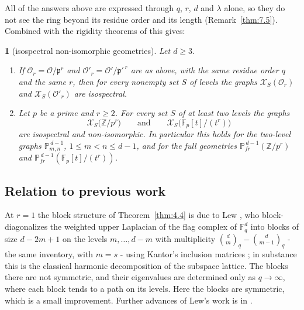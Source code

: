 \documentclass[11pt]{article}
\numberwithin{equation}{section}
\theoremstyle{plain}
\newcommand{\restatedname}{}
\newtheorem*{restated}{\restatedname}
\newenvironment{restate}[2]{\renewcommand{\restatedname}{#1~\ref{#2}}\begin{restated}}{\end{restated}}
\theoremstyle{definition}
\begin{document}
All of the answers above are expressed through $q$, $r$, $d$ and $\lambda$ alone, so
they do not see the ring beyond its residue order and its length (Remark~\ref{thm:7.5}).
Combined with the rigidity theorems of \cite{LP25} this gives:

\begin{restate}{Theorem}{thm:7.6}[isospectral non-isomorphic geometries]
Let $d\ge3$.
\begin{enumerate}
\item If $\mathcal{O}_r=\mathcal{O}/\mathfrak{p}^r$ and
  $\mathcal{O}'_r=\mathcal{O}'/\mathfrak{p}'^{\,r}$ are as above, with the same
  residue order $q$ and the same $r$, then for every nonempty set $S$ of levels the
  graphs $\mathcal{X}_S(\mathcal{O}_r)$ and $\mathcal{X}_S(\mathcal{O}'_r)$ are
  isospectral.
\item Let $p$ be a prime and $r\ge2$. For every set $S$ of at least two levels the graphs
  \[
  \mathcal{X}_S\bigl(\mathbb{Z}/p^r\bigr)\qquad\text{and}\qquad
  \mathcal{X}_S\bigl(\mathbb{F}_p[t]/(t^r)\bigr)
  \]
  are isospectral and non-isomorphic. In particular this holds for the two-level graphs
  $\mathbb{P}^{\,d-1}_{m,n}$, $1\le m<n\le d-1$, and for the full geometries
  $\mathbb{P}^{\,d-1}_{fr}(\mathbb{Z}/p^r)$ and $\mathbb{P}^{\,d-1}_{fr}(\mathbb{F}_p[t]/(t^r))$.
\end{enumerate}
\end{restate}

\subsection{Relation to previous work}\label{sec:1.3}

At $r=1$ the block structure of Theorem~\ref{thm:4.4} is due to Lew \cite{Lew24}, who
block-diagonalizes the weighted upper Laplacian of the flag complex of $\mathbb{F}_q^d$
into blocks of size $d-2m+1$ on the levels $m,\dots,d-m$ with multiplicity
$\binom dm_q-\binom d{m-1}_q$ - the same inventory, with $m=s$ - using Kantor's
inclusion matrices \cite{Kan72}; in substance this is the classical harmonic decomposition
of the subspace lattice. The blocks there are not symmetric, and their eigenvalues are
determined only as $q\to\infty$, where each block tends to a path on its levels. Here
the blocks are symmetric, which is a small improvement. Further advances of Lew's work is in \cite{Vol25}.
\end{document}
